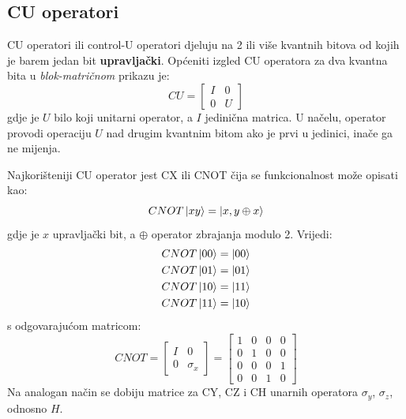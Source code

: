 \subsection{CU operatori}

CU operatori ili control-U operatori djeluju na 2 ili više kvantnih bitova od kojih je barem jedan bit \textbf{upravljački}. Općeniti izgled CU operatora za dva kvantna bita u \emph{blok-matričnom} prikazu je:
\begin{equation}
CU = \begin{bmatrix}
I & 0 \\ 0 & U
\end{bmatrix}
\label{eq:cu}
\end{equation}
gdje je $U$ bilo koji unitarni operator, a $I$ jedinična matrica. U načelu, operator provodi operaciju $U$ nad drugim kvantnim bitom ako je prvi u jedinici, inače ga ne mijenja.

Najkorišteniji CU operator jest CX ili CNOT čija se funkcionalnost može opisati kao:
\begin{equation}
CNOT\ket{xy} = \ket{x, y\oplus x}
\end{equation}
gdje je $x$ upravljački bit, a $\oplus$ operator zbrajanja modulo 2. Vrijedi:
\begin{equation}
\begin{aligned}
CNOT\ket{00} = \ket{00} \\
CNOT\ket{01} = \ket{01} \\
CNOT\ket{10} = \ket{11} \\
CNOT\ket{11} = \ket{10}
\end{aligned}
\end{equation}
s odgovarajućom matricom:
\begin{equation}
CNOT = \begin{bmatrix}
I & 0 \\ 0 & \sigma_x
\end{bmatrix} =
\begin{bmatrix}
1 & 0 & 0 & 0 \\ 0 & 1 & 0 & 0 \\ 0 & 0 & 0 & 1 \\ 0 & 0 & 1 & 0
\end{bmatrix}
\end{equation}
Na analogan način se dobiju matrice za CY, CZ i CH unarnih operatora $\sigma_y$, $\sigma_z$, odnosno $H$.

